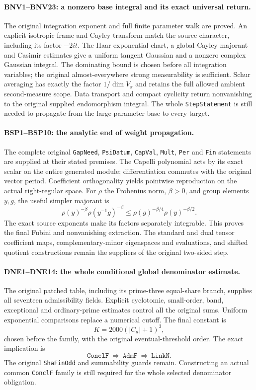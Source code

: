 \paragraph{BNV1--BNV23: a nonzero base integral and its exact universal return.}
The original integration exponent and full finite parameter walk are
proved. An explicit isotropic frame and Cayley transform match the
source character, including its factor $-2it$. The Haar exponential
chart, a global Cayley majorant and Casimir estimates give a uniform
tangent Gaussian and a nonzero complex Gaussian integral. The
dominating bound is chosen before all integration variables; the
original almost-everywhere strong measurability is sufficient. Schur
averaging has exactly the factor $1/\dim V_\pi$ and retains the full
allowed ambient second-measure scope. Data transport and compact
cyclicity return nonvanishing to the original supplied endomorphism
integral. The whole \texttt{StepStatement} is still needed to
propagate from the large-parameter base to every target.

\paragraph{BSP1--BSP10: the analytic end of weight propagation.}
The complete original \texttt{GapNeed}, \texttt{PsiDatum},
\texttt{CapVal}, \texttt{Mult}, \texttt{Per} and
\texttt{Fin} statements are supplied at their stated premises.
The Capelli polynomial acts by its exact scalar on the entire generated
module; differentiation commutes with the original vector period.
Coefficient orthogonality yields pointwise reproduction on the actual
right-regular space. For $\rho$ the Frobenius norm, $\beta>0$, and
group elements $y,g$, the useful simpler majorant is
\[
 \rho(y)^{-\beta}\rho(y^{-1}g)^{-\beta}
 \le \rho(g)^{-\beta/4}\rho(y)^{-\beta/2}.
\]
The exact source exponents make its factors separately integrable.
This proves the final Fubini and nonvanishing extraction. The standard
and dual tensor coefficient maps, complementary-minor eigenspaces and
evaluations, and shifted quotient constructions remain the suppliers
of the original two-sided step.

\paragraph{DNE1--DNE14: the whole conditional global denominator estimate.}
The original patched table, including its prime-three equal-share
branch, supplies all seventeen admissibility fields. Explicit
cyclotomic, small-order, band, exceptional and ordinary-prime estimates
control all the original sums. Uniform exponential comparisons replace
a numerical cutoff. The final constant is
\[
                    K=2000(|C_a|+1)^3,
\]
chosen before the family, with the original eventual-threshold order.
The exact implication is
\[
 \texttt{ConclF}\ \Longrightarrow\ \texttt{AdmF}
                  \ \Longrightarrow\ \texttt{LinkN}.
\]
The original \texttt{ShaFinOdd} and summability guards remain.
Constructing an actual common \texttt{ConclF} family is still required
for the whole selected denominator obligation.

